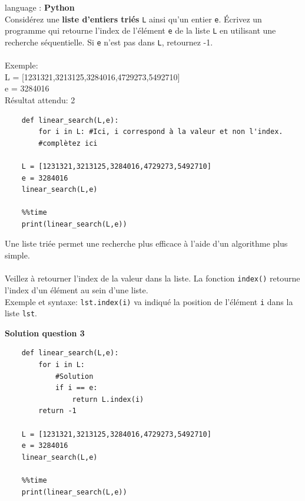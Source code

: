\begin{Exercice}[5 minutes] language : \textbf{Python}\\

    Considérez une \textbf{liste d’entiers triés} \lstinline{L} ainsi qu’un entier \lstinline{e}. Écrivez un programme qui retourne l'index de l'élément \lstinline{e} de la liste \lstinline{L} en utilisant une recherche séquentielle. Si \lstinline{e} n’est pas dans \lstinline{L}, retournez -1.\\\\
    
    Exemple:\\
    L = [1231321,3213125,3284016,4729273,5492710]\\
    e = 3284016\\
    Résultat attendu: 2\\
  
\begin{verbatim}
    def linear_search(L,e):
        for i in L: #Ici, i correspond à la valeur et non l'index.
        #complètez ici 
        
    L = [1231321,3213125,3284016,4729273,5492710]
    e = 3284016
    linear_search(L,e)
    
    %%time
    print(linear_search(L,e))
\end{verbatim}

    \begin{conseil}
        Une liste triée permet une recherche plus efficace à l'aide d'un algorithme plus simple.\\\\
        Veillez à retourner l'index de la valeur dans la liste. La fonction \lstinline{index()} retourne l'index d'un élément au sein d'une liste.\\Exemple et syntaxe: \lstinline{lst.index(i)} va indiqué la position de l'élément \lstinline{i} dans la liste \lstinline{lst}.
    \end{conseil}

    \textbf{Solution question 3}

    \begin{verbatim}
    def linear_search(L,e):
        for i in L:
            #Solution
            if i == e:
                return L.index(i)
        return -1
        
    L = [1231321,3213125,3284016,4729273,5492710]
    e = 3284016
    linear_search(L,e)
    
    %%time
    print(linear_search(L,e))
    \end{verbatim}
\end{Exercice}

